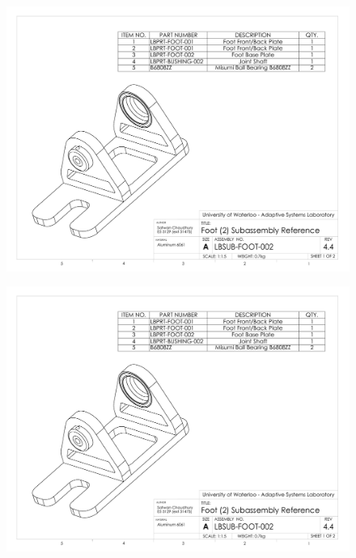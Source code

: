 \begin{figure}[!h]
	\begin{center}
    \includegraphics[scale=0.72,angle=90]{fig/drawings/lbsub-foot-002.pdf}
	\end{center}
\end{figure}

\begin{figure}[!h]
	\begin{center}
    \includegraphics[scale=0.72,angle=90,page=2]{fig/drawings/lbsub-foot-002.pdf}
	\end{center}
\end{figure}

\clearpage

